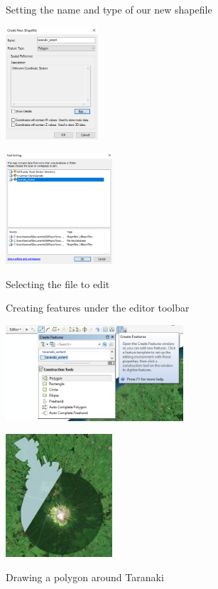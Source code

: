 \documentclass{article}
\begin{document}
\begin{figure}[h]
  \centering
  \begin{minipage}[b]{0.4\textwidth}
    \centering
    \caption{Setting the name and type of our new shapefile}
    \includegraphics[width=130px]{images/part1/newshp_featurename.PNG}
    \label{newshp_featurename}
  \end{minipage}
  \hfill
  \begin{minipage}[b]{0.4\textwidth}
    \centering
    \caption{Selecting the file to edit}
    \includegraphics[width=150px]{images/part1/newshp_startediting.PNG}
    \label{newshp_startediting}
  \end{minipage}
\end{figure}
\pagebreak
\begin{figure}[h]
  \centering
  \begin{minipage}[b]{0.4\textwidth}
    \centering
    \caption{Creating features under the editor toolbar}
    \includegraphics[width=250px]{images/part1/newshp_createfeatures.PNG}
    \label{newshp_createfeatures}
  \end{minipage}
  \hfill
  \begin{minipage}[b]{0.4\textwidth}
    \centering
    \caption{Drawing a polygon around Taranaki}
    \includegraphics[width=150px]{images/part1/newshp_drawingpolygon.PNG}
    \label{newshp_drawingpolygon}
  \end{minipage}
\end{figure}
\end{document}
